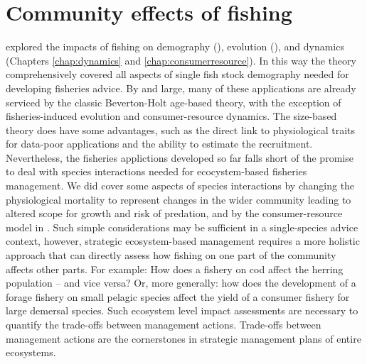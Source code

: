 
\chapter{Community effects of fishing}
\label{chap:communityfishing}
\textsc{} explored the impacts of fishing on demography (), evolution (), and dynamics (Chapters \ref{chap:dynamics} and \ref{chap:consumerresource}).  In this way the theory comprehensively covered all aspects of single fish stock demography needed for developing fisheries advice.  By and large, many of these applications are already serviced by the classic Beverton-Holt age-based theory, with the exception of fisheries-induced evolution and consumer-resource dynamics.  The size-based theory does have some advantages, such as the direct link to physiological traits for data-poor applications and the ability to estimate the recruitment.  Nevertheless, the fisheries applictions developed so far falls short of the promise to deal with species interactions needed for ecocystem-based fisheries management.  We did cover some aspects of species interactions by changing the physiological mortality to represent changes in the wider community leading to altered scope for growth and risk of predation, and by the consumer-resource model in .  Such simple considerations may be sufficient in a single-species advice context, however, strategic ecosystem-based management requires a more holistic approach that can directly assess how fishing on one part of the community affects other parts. For example: How does a fishery on cod affect the herring population -- and vice versa?  Or, more generally: how does the development of a forage fishery on small pelagic species affect the yield of a consumer fishery for large demersal species.  Such ecosystem level impact assessments are necessary to quantify the trade-offs between management actions.  Trade-offs between management actions are the cornerstones in strategic management plans of entire ecosystems.

